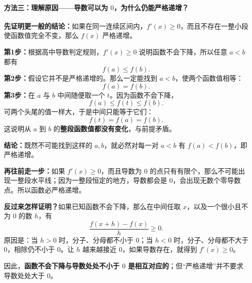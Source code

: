 \clearpage
\begin{proofbox}
\paragraph{方法三：理解原因——导数可以为 $0$，为什么仍能严格递增？}
\begin{center}\end{center}

\textbf{先证明更一般的结论：}如果在同一连续区间内，$f'(x)\ge0$，而且不存在一整小段使函数值完全不变，那么 $f(x)$ 严格递增。

\textbf{第1步：}根据高中导数判定规则，$f'(x)\ge0$ 说明函数不会下降，所以任意 $a<b$ 都有
\[
f(a)\le f(b).
\]
\textbf{第2步：}假设它并不是严格递增的。那么一定能找到 $a<b$，使两个函数值相等：
\[
f(a)=f(b).
\]
\textbf{第3步：}在 $a$ 与 $b$ 中间随便取一个 $t$。因为函数不会下降，
\[
f(a)\le f(t)\le f(b).
\]
可两个头尾的值一样大，于是中间只能等于它们：
\[
f(t)=f(a)=f(b).
\]
这说明从 $a$ 到 $b$ 的\textbf{整段函数值都没有变化}，与前提矛盾。

\textbf{结论：}既然不可能找到这样的 $a,b$，就必然对每一对 $a<b$ 有 $f(a)<f(b)$，即严格递增。

\textbf{再往前走一步：}如果 $f'(x)\ge0$，而且导数为 $0$ 的点只有有限个，那么不可能出现一整段水平线；因为一整段恒定的地方，导数都会是 $0$，会出现无数个零导数点。所以函数必严格递增。

\textbf{反过来怎样证明？}如果已知函数不会下降，那么在中间任取 $x$，以及一个很小且不为 $0$ 的数 $h$，有
\[
\frac{f(x+h)-f(x)}{h}\ge0.
\]
原因是：当 $h>0$ 时，分子、分母都不小于 $0$；当 $h<0$ 时，分子、分母都不大于 $0$，相除仍不小于 $0$。让 $h$ 越来越接近 $0$，如果导数存在，就得到 $f'(x)\ge0$。

因此，\textbf{函数不会下降与导数处处不小于 $0$ 是相互对应的}；但``严格递增''并不要求导数处处大于 $0$。
\end{proofbox}
